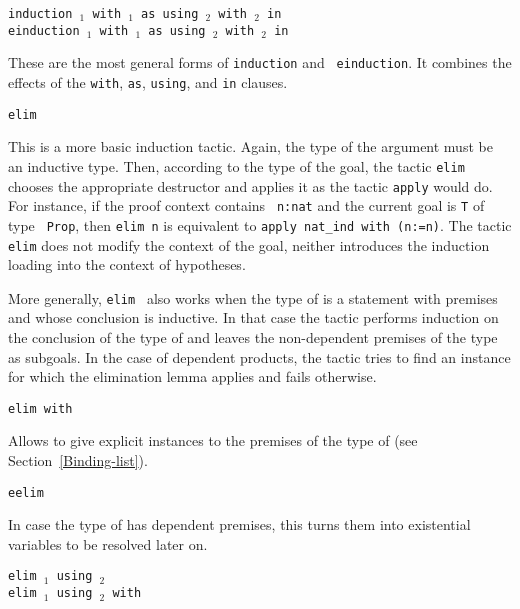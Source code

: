 \begin{coq_example*}
\begin{Variants}
\item {\tt induction {\term$_1$} with {\bindinglist$_1$} as {\namingintropattern} {\disjconjintropattern} using {\term$_2$} with {\bindinglist$_2$} in {\occgoalset}}\\
     {\tt einduction {\term$_1$} with {\bindinglist$_1$} as {\namingintropattern} {\disjconjintropattern} using {\term$_2$} with {\bindinglist$_2$} in {\occgoalset}}

  These are the most general forms of {\tt induction} and {\tt
  einduction}.  It combines the effects of the {\tt with}, {\tt as},
  {\tt using}, and {\tt in} clauses.

\item {\tt elim \term}\label{elim}

  This is a more basic induction tactic.  Again, the type of the
  argument {\term} must be an inductive type. Then, according to
  the type of the goal, the tactic {\tt elim} chooses the appropriate
  destructor and applies it as the tactic {\tt apply}
  would do. For instance, if the proof context contains {\tt
  n:nat} and the current goal is {\tt T} of type {\tt
  Prop}, then {\tt elim n} is equivalent to {\tt apply nat\_ind with
  (n:=n)}.  The tactic {\tt elim} does not modify the context of
  the goal, neither introduces the induction loading into the context
  of hypotheses.

  More generally, {\tt elim \term} also works when the type of {\term}
  is a statement with premises and whose conclusion is inductive.  In
  that case the tactic performs induction on the conclusion of the
  type of {\term} and leaves the non-dependent premises of the type as
  subgoals.  In the case of dependent products, the tactic tries to
  find an instance for which the elimination lemma applies and fails
  otherwise.

\item {\tt elim {\term} with {\bindinglist}}

  Allows to give explicit instances to the premises of the type
  of {\term} (see Section~\ref{Binding-list}).

\item{\tt eelim {\term}}

  In case the type of {\term} has dependent premises, this turns them into
  existential variables to be resolved later on.

\item{\tt elim {\term$_1$} using {\term$_2$}}\\
     {\tt elim {\term$_1$} using {\term$_2$} with {\bindinglist}}


\end{Variants}
\end{coq_example*}
